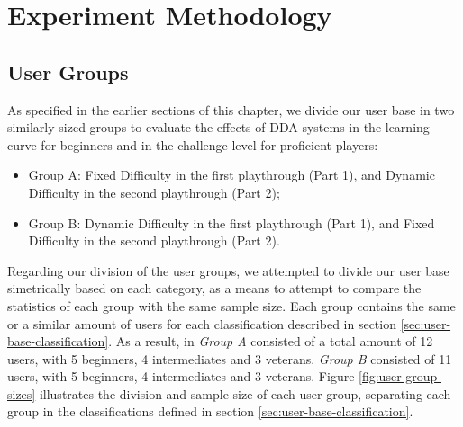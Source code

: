 
\section{Experiment Methodology}
\label{sec:experiment-methodology}


\subsection{User Groups}


As specified in the earlier sections of this chapter, we divide our user base in two similarly sized groups to evaluate the effects of DDA systems in the learning curve for beginners and in the challenge level for proficient players:
\begin{itemize}
    \item{Group A: Fixed Difficulty in the first playthrough (Part 1), and Dynamic Difficulty in the second playthrough (Part 2);}
    \item{Group B: Dynamic Difficulty in the first playthrough (Part 1), and Fixed Difficulty in the second playthrough (Part 2).}
\end{itemize}


Regarding our division of the user groups, we attempted to divide our user base simetrically based on each category, as a means to attempt to compare the statistics of each group with the same sample size. Each group contains the same or a similar amount of users for each classification described in section \ref{sec:user-base-classification}. As a result, in \emph{Group A} consisted of a total amount of 12 users, with 5 beginners, 4 intermediates and 3 veterans. \emph{Group B} consisted of 11 users, with 5 beginners, 4 intermediates and 3 veterans. Figure \ref{fig:user-group-sizes} illustrates the division and sample size of each user group, separating each group in the classifications defined in section \ref{sec:user-base-classification}.

